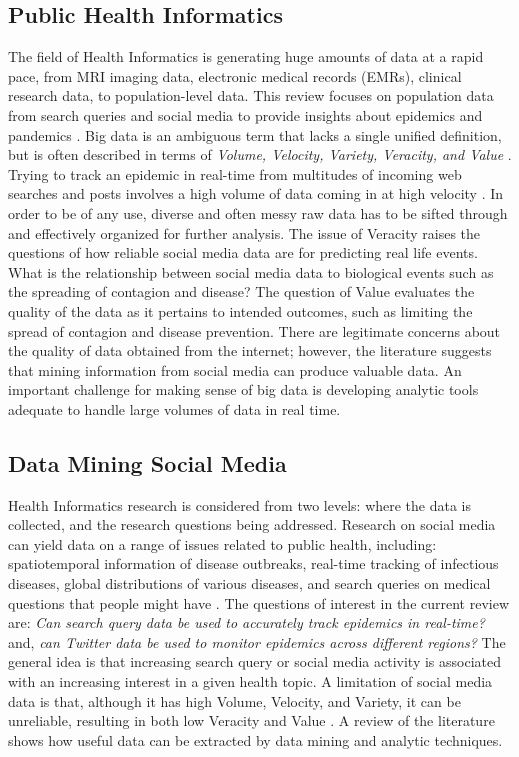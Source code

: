 \documentclass[sigconf]{acmart}
\begin{document}
\subsection{Public Health Informatics}

The field of Health Informatics is generating huge amounts of data at a rapid pace,
from MRI imaging data, electronic medical records (EMRs), clinical research data, to
population-level data. This review focuses on population data from search queries and 
social media to provide insights about epidemics and pandemics \cite{hay13, herland14}. 
Big data is an ambiguous term that lacks a single unified definition, but is often 
described in terms of {\it Volume, Velocity, Variety, Veracity, and Value}
\cite{demchenko12}. Trying to track an epidemic in real-time from multitudes of 
incoming web searches and posts involves a high volume of data coming in at high 
velocity \cite{lamb13, paul14}. In order to be of any use, diverse and often messy 
raw data has to be sifted through and effectively organized for further analysis. 
The issue of Veracity raises the questions of how reliable social media data are for 
predicting real life events. What is the relationship between social media data to 
biological events such as the spreading of contagion and disease? The question of 
Value evaluates the quality of the data as it pertains to intended outcomes, such 
as limiting the spread of contagion and disease prevention. There are legitimate 
concerns about the quality of data obtained from the internet; however, the 
literature suggests that mining information from social media can produce valuable 
data. An important challenge for making sense of big data is developing analytic 
tools adequate to handle large volumes of data in real time.

\subsection{Data Mining Social Media}

Health Informatics research is considered from two levels: where the data is 
collected, and the research questions being addressed. Research on social media 
can yield data on a range of issues related to public health, including: 
spatiotemporal information of disease outbreaks, real-time tracking of infectious 
diseases, global distributions of various diseases, and search queries on medical 
questions that people might have \cite{herland14}. The questions of interest in the 
current review are: \textit{Can search query data be used to accurately track epidemics 
in real-time?} and, \textit{can Twitter data be used to monitor epidemics across 
different regions?} The general idea is that increasing search query or social 
media activity is associated with an increasing interest in a given health topic. 
A limitation of social media data is that, although it has high Volume, Velocity, 
and Variety, it can be unreliable, resulting in both low Veracity and Value 
\cite{hay13, lazer14}. A review of the literature shows how useful data can be 
extracted by data mining and analytic techniques. 
\end{document}
